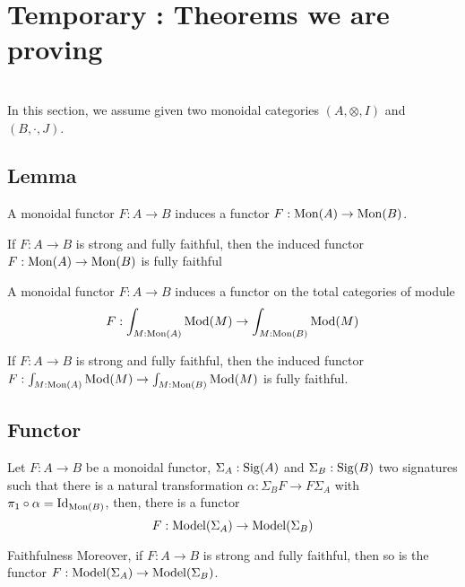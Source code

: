 \section{Temporary : Theorems we are proving }

 \\

\noindent In this section, we assume given two monoidal categories
$(A,\otimes,I)$ and $(B,\cdot,J)$.

\subsection{Lemma}

\begin{lemma}
  A monoidal functor $F : A \to B$ induces a functor $F : \operatorname{Mon}(A) \to \operatorname{Mon}(B)$.
\end{lemma}

\begin{lemma}
  If $F : A \to B$ is strong and fully faithful, then the induced functor $F
  : \operatorname{Mon}(A) \to \operatorname{Mon}(B)$ is fully faithful
\end{lemma}

\begin{lemma}
  A monoidal functor $F : A \to B$ induces a functor on the total categories
  of module
  \[ F : \int_{M:\operatorname{Mon}(A)} \operatorname{Mod}(M) \to \int_{M:\operatorname{Mon}(B)} \operatorname{Mod}(M) \]
\end{lemma}

\begin{lemma}
  If $F : A \to B$ is strong and fully faithful, then the induced functor
  $F : \int_{M:\operatorname{Mon}(A)} \operatorname{Mod}(M) \to \int_{M:\operatorname{Mon}(B)} \operatorname{Mod}(M)$ is fully faithful.
\end{lemma}

\subsection{Functor}
\begin{theorem}
  \label{thm:fct-models}
  Let $F : A \to B$ be a monoidal functor, $\Sigma_A : \operatorname{Sig}(A)$ and
  $\Sigma_B : \operatorname{Sig}(B)$ two signatures such that there is a natural
  transformation $\alpha : \Sigma_B F \to F \Sigma_A$ with $\pi_1 \circ
  \alpha = \operatorname{Id}_{\operatorname{Mon}(B)}$, then, there is a functor
  \[ F : \operatorname{Model}(\Sigma_A) \to \operatorname{Model}(\Sigma_B) \]
\end{theorem}

\begin{theorem}{Faithfulness}
  Moreover, if $F : A \to B$ is strong and fully faithful, then so is the
  functor $F : \operatorname{Model}(\Sigma_A) \to \operatorname{Model}(\Sigma_B)$.
\end{theorem}

